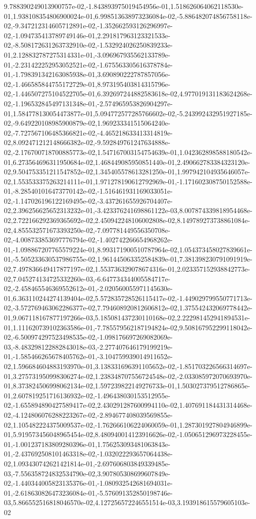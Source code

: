 9.788390249013900757e-02,-1.843893975019454956e-01,1.518626064062118530e-01,1.938108354806900024e-01,6.998513638973236084e-02,-5.886482074856758118e-02,-9.347212314605712891e-02,-1.352662593126296997e-02,-1.094735413789749146e-01,2.291817963123321533e-02,-8.508172631263732910e-02,-1.532924026250839233e-01,2.128832787275314331e-01,-3.096967935562133789e-01,-2.231422252953052521e-02,-1.675563305616378784e-01,-1.798391342163085938e-01,3.690890222787857056e-02,-1.466585844755172729e-01,8.973195403814315796e-02,-1.446507275104522705e-01,6.392697244882583618e-02,4.977019131183624268e-02,-1.196532845497131348e-01,-2.574965953826904297e-01,1.584778130054473877e-01,5.094772577285766602e-02,-5.243992432951927185e-02,-9.649220108985900879e-02,1.969233341515064240e-02,-7.727567106485366821e-02,-4.465218633413314819e-02,8.092471212148666382e-02,-9.592849761247634888e-02,-2.176700718700885773e-02,1.547167003154754639e-01,1.042362898588180542e-01,6.273564696311950684e-02,1.468449085950851440e-01,2.490662783384323120e-02,9.504753351211547852e-02,1.345405578613281250e-01,1.997942104935646057e-02,1.553533375263214111e-01,1.971278190612792969e-01,-1.171602308750152588e-01,-8.285401016473770142e-02,-1.516461931169033051e-02,-1.147026196122169495e-02,-3.437261655926704407e-02,2.396256625652313232e-01,-3.423376241698861122e-03,8.007874339818954468e-02,2.722166292369365692e-02,2.450942248106002808e-02,8.149789273738861084e-02,4.855532571673393250e-02,-7.097781449556350708e-02,-4.008733853697776794e-02,-1.402742266654968262e-01,-1.098867207765579224e-01,8.993171900510787964e-02,1.054373458027839661e-01,-5.505233630537986755e-02,1.961445063352584839e-01,7.381398230791091919e-02,7.497836649417877197e-02,1.553736329078674316e-01,2.023357152938842773e-02,7.045274134725332260e-03,-6.647734344005584717e-02,-2.458465546369552612e-01,-2.020560055971145630e-01,6.363110244274139404e-02,5.572835728526115417e-02,-1.449029799550771713e-02,-3.572769463062286377e-02,7.794608920812606812e-02,1.375542432069778442e-01,9.067118167877197266e-03,5.185081437230110168e-02,2.222981452941894531e-01,1.111620739102363586e-01,-7.785579562187194824e-02,9.508167952299118042e-02,-6.500974297523498535e-02,-1.098176697269082069e-03,-8.483298122882843018e-03,-2.277407646179199219e-01,-1.585466265678405762e-01,-3.104759939014911652e-02,1.596684604883193970e-01,3.138331696391105652e-02,-1.851703226566314697e-01,3.275731950998306274e-02,1.238348707556724548e-02,-2.033085972070693970e-01,8.373824506998062134e-02,1.597239822149276733e-01,1.503027379512786865e-01,2.607819251716136932e-02,-1.496438030153512955e-02,-1.655894890427589417e-02,2.430291287600994110e-02,1.407691184431314468e-02,-4.124806076288223267e-02,-2.894677408039569855e-02,1.105482224375009537e-02,-1.762666106224060059e-01,1.287301927804946899e-01,5.919573456048965454e-02,8.480940014123916626e-02,-1.050651296973228455e-01,-1.001237183809280396e-01,1.756253093481063843e-01,-2.437692508101463318e-02,-1.032022293657064438e-02,1.093430742621421814e-01,-2.697606803849339485e-03,-7.556358724832534790e-02,3.907805308699607849e-02,-1.440344005823135376e-01,-1.080932542681694031e-01,-2.618630826473236084e-01,-5.576091352850198746e-03,5.866552516818046570e-02,4.127256572246551514e-03,3.193918615579605103e-02
